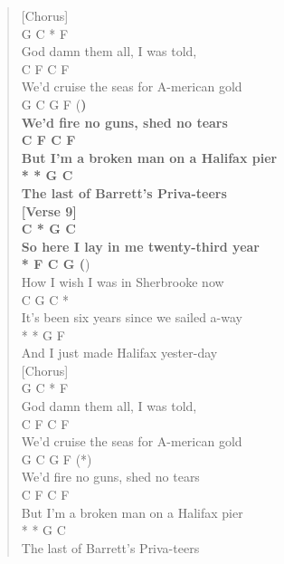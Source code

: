 \documentclass[11pt]{article}
\begin{document}
\begin{verse}
\vspace*{1em}
[Chorus]\\
\hspace*{4em}G         C    *     F\\
God damn them all, I was told,\\
\hspace*{5em}C          F          C       F\\
We'd cruise the seas for A-merican gold\\
\hspace*{5em}G       C     G       F     (\textbf{)\\
We'd fire no guns, shed no tears\\
\hspace*{10em}C      F        C       F\\
But I'm a broken man on a Halifax pier\\
\hspace*{4em}*       *         G     C\\
The last of Barrett's Priva-teers\\
\vspace*{1em}
[Verse 9]\\
\hspace*{3em}C      *         G            C\\
So here I lay in me twenty-third year\\
\hspace*{6em}*      F      C          G     (})\\
How I wish I was in Sherbrooke now\\
\hspace*{5em}C        G              C        *\\
It's been six years since we sailed a-way\\
\hspace*{6em}*         *       G      F\\
And I just made Halifax yester-day\\
\vspace*{1em}
[Chorus]\\
\hspace*{4em}G         C    *     F\\
God damn them all, I was told,\\
\hspace*{5em}C          F          C       F\\
We'd cruise the seas for A-merican gold\\
\hspace*{5em}G       C     G       F     (*)\\
We'd fire no guns, shed no tears\\
\hspace*{10em}C      F        C       F\\
But I'm a broken man on a Halifax pier\\
\hspace*{4em}*       *         G     C\\
The last of Barrett's Priva-teers\\
\end{verse}
\clearpage
\end{document}
